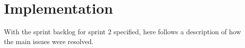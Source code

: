 \section{Implementation}
With the sprint backlog for sprint 2 specified, here follows a description of how the main issues were resolved.









